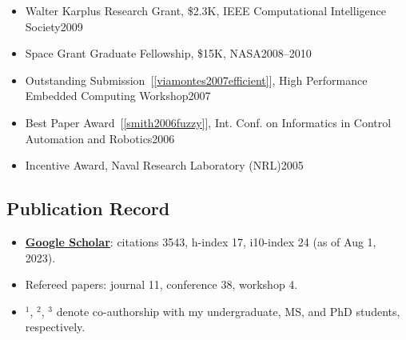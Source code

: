 \documentclass[11pt]{article}
\newcommand{\mygooglescholar}{\href{https://scholar.google.com/citations?user=TLcVQ-MAAAAJ}{Google Scholar}}
\begin{document}
\begin{itemize}
\item Walter Karplus Research Grant, \$2.3K, IEEE Computational Intelligence Society\hfill 2009 
\item Space Grant Graduate Fellowship, \$15K, NASA\hfill 2008--2010 
\item Outstanding Submission~[\ref{viamontes2007efficient}], High Performance Embedded Computing Workshop\hfill 2007
\item  Best Paper Award~[\ref{smith2006fuzzy}],  Int. Conf. on Informatics in Control Automation and Robotics\hfill 2006
\item Incentive Award,  Naval Research Laboratory (NRL)\hfill 2005
\end{itemize}

\subsection{Publication Record}

\begin{itemize}[label={},before=\small]
\item \textbf{\mygooglescholar{}}: citations 3543, h-index 17, i10-index 24 (as of Aug 1, 2023).
\item Refereed papers:  journal 11, conference 38, workshop 4.
\item \(^1\), \(^2\), \(^3\) denote co-authorship with my undergraduate, MS, and PhD students, respectively.
\end{itemize}
\end{document}
